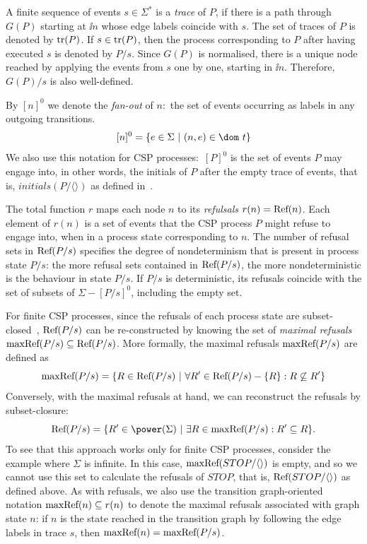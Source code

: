A finite sequence of events $s\in\Sigma^*$ is a \emph{trace} of $P$, if there
is a path through $G(P)$ starting  at $\ii n$ whose edge labels coincide with
$s$. The set of traces of $P$ is denoted by $\text{tr}(P)$. If $s\in\text{tr}(P)$, then
the process corresponding to $P$ after having executed $s$ is denoted by
$P/s$. Since $G(P)$ is normalised, there is a unique node reached by applying
the events from $s$ one by one, starting in $\ii n$. Therefore, $G(P)/s$  is
also well-defined.

By $[n]^0$ we denote the \emph{fan-out} of $n$:~the set of events occurring
as labels in any outgoing transitions.
$$
[n]^0 = \{ e\in\Sigma~|~(n,e)\in\dom~t \}
$$
We also use this notation for CSP processes:~$[P]^0$ is the set
of events $P$ may engage into, in other words, the initials of $P$ after the
empty trace of events, that is, $initials(P/\langle\rangle)$ as defined
in~\cite{Roscoe2010}.

The total function $r$ maps each node $n$ to its \emph{refulsals} $r(n) =
\text{Ref}(n)$. Each element of $r(n)$ is a set of events that the CSP process $P$
might refuse to engage into, when in a process state corresponding to $n$.
The number of refusal sets in $\text{Ref}(P/s)$ specifies the degree of
nondeterminism that is present in process state $P/s$: the more refusal sets
contained in  $\text{Ref}(P/s)$, the more nondeterministic is the behaviour in
state $P/s$. If $P/s$ is deterministic, its refusals coincide with the set of
subsets of $\Sigma - [P/s]^0$, including the empty set.

For finite CSP processes, since the refusals of each process state are
subset-closed~\cite{Hoare:1985:CSP:3921,Roscoe2010}, $\text{Ref}(P/s)$ can be
re-constructed by knowing the set of \emph{maximal refusals}
$\text{maxRef}(P/s)\subseteq\text{Ref}(P/s)$. More formally, the maximal refusals
$\text{maxRef}(P/s)$ are defined as
$$
\text{maxRef}(P/s) = \{ R \in\text{Ref}(P/s)~|~\forall R'\in \text{Ref}(P/s) - \{ R\}: R \not\subseteq R'\}
$$
Conversely, with the maximal refusals at hand, we can reconstruct the refusals by subset-closure:
$$
\refs(P/s) = \{ R'\in\power(\Sigma)~|~\exists R\in \maxrefs(P/s): R'\subseteq R \}.
$$
To see that this approach works only for finite CSP processes, consider the
example where $\Sigma$ is infinite. In this case,
$\text{maxRef}(STOP/\langle\rangle)$ is empty, and so we cannot use this set to
calculate the refusals of $STOP$, that is, $\text{Ref}(STOP/\langle\rangle)$ as
defined above. As with refusals, we also use the transition graph-oriented
notation $\text{maxRef}(n) \subseteq r(n)$ to denote the maximal refusals
associated with graph state $n$: if $n$ is the state reached in the
transition graph by following the edge labels in trace $s$, then $\text{maxRef}(n)
= \text{maxRef}(P/s)$.

